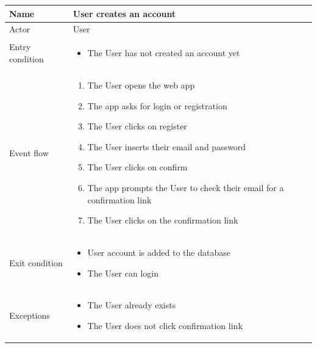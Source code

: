\begin{table}[H]
    \begin{tabu} to \textwidth {|X|X[4]|}
        \hline
        Name            & User creates an account   \\ \hline
        Actor           & User                      \\ \hline
        Entry condition & \begin{itemize}
            \item The User has not created an account yet
        \end{itemize} \\ \hline
        Event flow      & \begin{enumerate}
            \item The User opens the web app
            \item The app asks for login or registration
            \item The User clicks on register
            \item The User inserts their email and password
            \item The User clicks on confirm
            \item The app prompts the User to check their email for a confirmation link
            \item The User clicks on the confirmation link
        \end{enumerate} \\ \hline
        Exit condition  & \begin{itemize}
            \item User account is added to the database
            \item The User can login
        \end{itemize} \\ \hline
        Exceptions      & \begin{itemize}
            \item The User already exists
            \item The User does not click confirmation link
        \end{itemize} \\ \hline
    \end{tabu}
\end{table}

